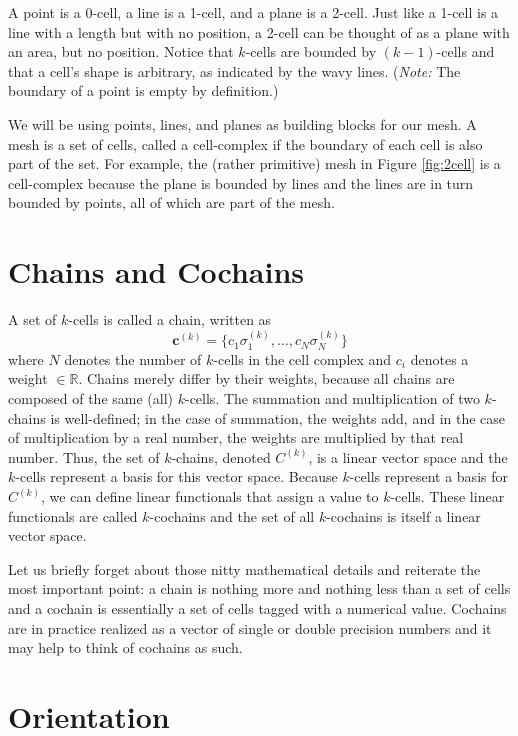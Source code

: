 A point is a 0-cell, a line is a 1-cell, and a plane is a 2-cell. Just like a 1-cell is a line with a length but with no position, a 2-cell can be thought of as a plane with an area, but no position. Notice that $k$-cells are bounded by $(k-1)$-cells and that a cell's shape is arbitrary, as indicated by the wavy lines. (\textit{Note:} The boundary of a point is empty by definition.)

We will be using points, lines, and planes as building blocks for our mesh. A mesh is a set of cells, called a cell-complex if the boundary of each cell is also part of the set. For example, the (rather primitive) mesh in Figure \ref{fig:2cell} is a cell-complex because the plane is bounded by lines and the lines are in turn bounded by points, all of which are part of the mesh.

\section{Chains and Cochains}

A set of $k$-cells is called a chain, written as
\begin{equation}
    \mathbf{c}^{(k)} = \{c_1 \sigma^{(k)}_1, \ldots, c_N \sigma^{(k)}_N \}
\end{equation}
where $N$ denotes the number of $k$-cells in the cell complex and $c_i$ denotes a weight $\in \mathbb{R}$. Chains merely differ by their weights, because all chains are composed of the same (all) $k$-cells. The summation and multiplication of two $k$-chains is well-defined; in the case of summation, the weights add, and in the case of multiplication by a real number, the weights are multiplied by that real number. Thus, the set of $k$-chains, denoted $C^{(k)}$, is a linear vector space and the $k$-cells represent a basis for this vector space. Because $k$-cells represent a basis for $C^{(k)}$, we can define linear functionals that assign a value to $k$-cells. These linear functionals are called $k$-cochains and the set of all $k$-cochains is itself a linear vector space.

Let us briefly forget about those nitty mathematical details and reiterate the most important point: a chain is nothing more and nothing less than a set of cells and a cochain is essentially a set of cells tagged with a numerical value. Cochains are in practice realized as a vector of single or double precision numbers and it may help to think of cochains as such.

\section{Orientation}

